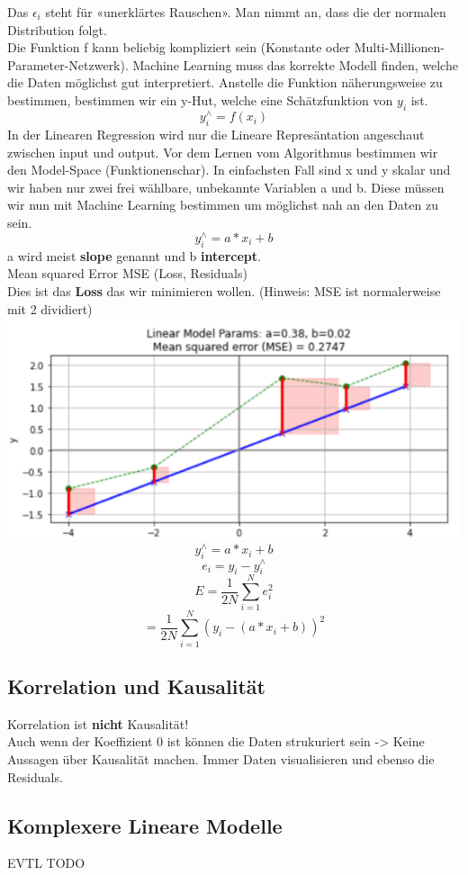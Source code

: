 Das $\epsilon_i$ steht für «unerklärtes Rauschen». Man nimmt an, dass die der normalen Distribution folgt.\\
Die Funktion f kann beliebig kompliziert sein (Konstante oder Multi-Millionen-Parameter-Netzwerk). Machine Learning muss das korrekte Modell finden, welche die Daten möglichst gut interpretiert. Anstelle die Funktion näherungsweise zu bestimmen, bestimmen wir ein y-Hut, welche eine Schätzfunktion von $y_i$ ist.
$$y^\wedge_{i} = f(x_i)$$
In der Linearen Regression wird nur die Lineare Represäntation angeschaut zwischen input und output. Vor dem Lernen vom Algorithmus bestimmen wir den Model-Space (Funktionenschar). In einfachsten Fall sind x und y skalar und wir haben nur zwei frei wählbare, unbekannte Variablen a und b. Diese müssen wir nun mit Machine Learning bestimmen um möglichst nah an den Daten zu sein.
$$y^\wedge_{i} = a * x_i + b$$
a wird meist \textbf{slope} genannt und b \textbf{intercept}.\\
\textcolor{myblue}{Mean squared Error MSE (Loss, Residuals)}\\
Dies ist das \textbf{Loss} das wir minimieren wollen. (Hinweis: MSE ist normalerweise mit 2 dividiert)
\includegraphics[width=\linewidth]{img/mse.png}
$$y^\wedge_{i} = a * x_i + b$$
$$e_i=y_i-y^\wedge_{i}$$
$$E=\frac{1}{2N}\sum_{i=1}^N e^2_i$$
$$=\frac{1}{2N}\sum_{i=1}^N(y_i-(a * x_i + b))^2$$
\subsection{Korrelation und Kausalität}
Korrelation ist \textbf{nicht} Kausalität!\\
Auch wenn der Koeffizient 0 ist können die Daten strukuriert sein -> Keine Aussagen über Kausalität machen. Immer Daten visualisieren und ebenso die Residuals.
\subsection{Komplexere Lineare Modelle}
EVTL TODO
